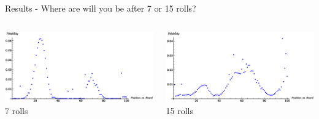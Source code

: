 \documentclass[14pt]{beamer}
\begin{document}
\begin{frame}{Results - Where are will you be after 7 or 15 rolls?}
  \begin{columns}
      \begin{center}
      \includegraphics[width=\linewidth]{images/7plot}\\
      7 rolls
      \end{center}
      \begin{center}
      \includegraphics[width=\linewidth]{images/15plot}\\
      15 rolls
      \end{center}
  \end{columns}
\end{frame}
\end{document}
